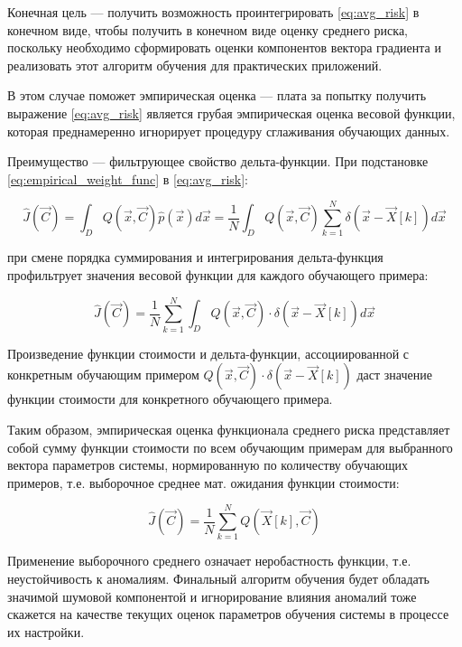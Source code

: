 \documentclass[a4paper]{article}
\numberwithin{equation}{subsection}
\begin{document}
Конечная цель --- получить возможность проинтегрировать \ref{eq:avg_risk} в конечном 
виде, чтобы получить в конечном виде оценку среднего риска, поскольку
необходимо сформировать оценки компонентов вектора градиента и реализовать этот 
алгоритм обучения для практических приложений. 

В этом случае поможет эмпирическая оценка --- плата за попытку 
получить выражение \ref{eq:avg_risk} является грубая эмпирическая 
оценка весовой функции, которая преднамеренно игнорирует процедуру
сглаживания обучающих данных.

Преимущество --- фильтрующее свойство дельта-функции. При подстановке \ref{eq:empirical_weight_func}
в \ref{eq:avg_risk}:

\begin{equation}
    \hat{J}(\vec{C}) = \int_{D} Q(\vec{x}, \vec{C}) \hat{p}(\vec{x}) d\vec{x}
    = \dfrac{1}{N} \int_{D} Q(\vec{x}, \vec{C}) \sum_{k=1}^{N} \delta(\vec{x} - 
    \vec{X}[k]) d\vec{x}
\end{equation}

\noindent
при смене порядка суммирования и интегрирования дельта-функция \glqq профильтрует \grqq
значения весовой функции для каждого обучающего примера:

\begin{equation}
    \hat{J}(\vec{C}) = \dfrac{1}{N} \sum_{k=1}^{N} \int_{D} 
    Q(\vec{x}, \vec{C}) \cdot \delta(\vec{x} - \vec{X}[k]) d\vec{x}
\end{equation}

Произведение функции стоимости и дельта-функции, ассоциированной с конкретным обучающим
примером $Q(\vec{x}, \vec{C}) \cdot \delta(\vec{x} - \vec{X}[k])$ даст значение функции
стоимости для конкретного обучающего примера.

Таким образом, эмпирическая оценка функционала среднего риска представляет собой сумму
функции стоимости по всем обучающим примерам для выбранного вектора параметров системы,
нормированную по количеству обучающих примеров, т.е. выборочное среднее мат. ожидания
функции стоимости:

\begin{equation}
    \hat{J}(\vec{C}) = \dfrac{1}{N} \sum_{k=1}^{N} Q(\vec{X}[k], \vec{C})
\end{equation}

Применение выборочного среднего означает неробастность функции, т.е. неустойчивость
к аномалиям. Финальный алгоритм обучения будет обладать значимой шумовой компонентой 
и игнорирование влияния аномалий тоже скажется на качестве текущих оценок параметров 
обучения системы в процессе их настройки.
\end{document}

